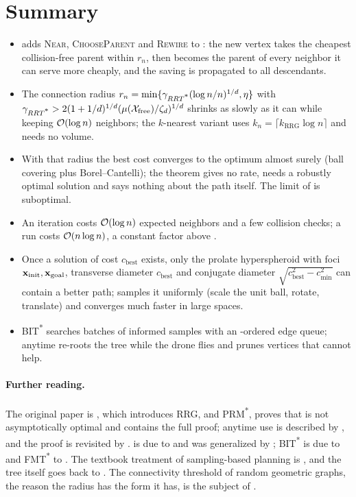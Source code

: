 \section{Summary}
\label{sec:ch17-summary}
\begin{summary}
\begin{itemize}
  \item \rrtstar adds \textsc{Near}, \textsc{ChooseParent} and
  \textsc{Rewire} to \rrt: the new vertex takes the cheapest collision-free
  parent within $r_n$, then becomes the parent of every neighbor it can
  serve more cheaply, and the saving is propagated to all descendants.
  \item The connection radius
  $r_n=\min\{\gamma_{RRT\textsuperscript{*}}(\log n/n)^{1/d},\eta\}$ with
  $\gamma_{RRT\textsuperscript{*}}>2(1+1/d)^{1/d}(\mu(\mathcal{X}_{\mathrm{free}})/\zeta_d)^{1/d}$ shrinks as
  slowly as it can while keeping $\mathcal{O}\!\left(\log n\right)$ neighbors; the $k$-nearest
  variant uses $k_n=\lceil k_{\mathrm{RRG}}\log n\rceil$ and needs no
  volume.
  \item With that radius the best cost converges to the optimum almost
  surely (ball covering plus Borel--Cantelli); the theorem gives no rate,
  needs a robustly optimal solution and says nothing about the path itself.
  The limit of \rrt is suboptimal.
  \item An iteration costs $\mathcal{O}\!\left(\log n\right)$ expected neighbors and a few
  collision checks; a run costs $\mathcal{O}\!\left(n\log n\right)$, a constant factor above
  \rrt.
    \item Once a solution of cost $c_{\mathrm{best}}$ exists, only the
  prolate hyperspheroid with foci $\mathbf{x}_{\mathrm{init}},\mathbf{x}_{\mathrm{goal}}$,
  transverse diameter $c_{\mathrm{best}}$ and conjugate diameter
  $\sqrt{c_{\mathrm{best}}^2-c_{\min}^2}$ can contain a better path;
  \irrtstar samples it uniformly (scale the unit ball, rotate, translate)
  and converges much faster in large spaces.
  \item BIT\textsuperscript{*} searches batches of informed samples with
  an \astar-ordered edge queue; anytime \rrtstar re-roots the tree while
  the drone flies and prunes vertices that cannot help.
\end{itemize}
\end{summary}

\paragraph{Further reading.}
The original paper is \textcite{karaman2011sampling}, which introduces
RRG, \rrtstar and PRM\textsuperscript{*}, proves that \rrt is not
asymptotically optimal and contains the full proof; anytime use is described
by \textcite{karaman2011anytime}, and the proof is revisited by
\textcite{solovey2020revisiting}. \irrtstar is due to
\textcite{gammell2014informed} and was generalized by
\textcite{gammell2018informed}; BIT\textsuperscript{*} is due to
\textcite{gammell2015bit} and FMT\textsuperscript{*} to
\textcite{janson2015fmt}. The textbook treatment of
sampling-based planning is \textcite{lavalle2006planning}, and the tree
itself goes back to \textcite{lavalle1998rrt}. The connectivity threshold
of random geometric graphs, the reason the radius has the form it has, is
the subject of \textcite{penrose2003random}.

